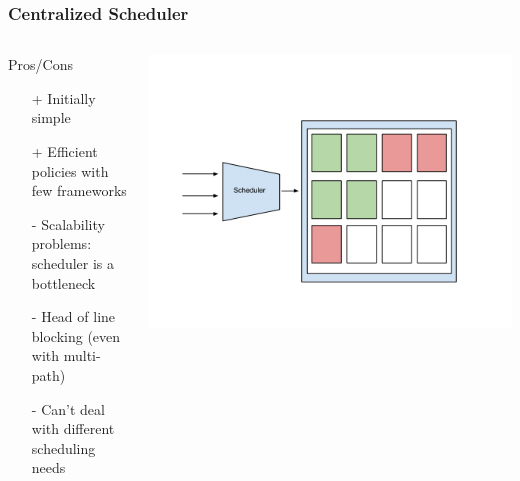 \documentclass[notes=hide]{beamer}
\begin{document}
  \note{}

  \begin{frame}
    \frametitle{Centralized Scheduler}
    \begin{columns}[T]
       \begin{column}{.5\textwidth}
        \begin{block}{Pros/Cons}
            \begin{itemize}
              \item[+] Initially simple
              \item[+] Efficient policies with few frameworks
              \item[-] Scalability problems: scheduler is a bottleneck
              \item[-] Head of line blocking (even with multi-path)
              \item[-] Can't deal with different scheduling needs
            \end{itemize}
        \end{block}
       \end{column}
       \begin{column}{.6\textwidth}
         \includegraphics[trim = 0mm 0mm 50mm 0mm,clip,scale=0.20,natwidth=960,natheight=720]{CentralizedScheduler.png}
       \end{column}
     \end{columns}
  \end{frame}

  \note{}
\end{document}
